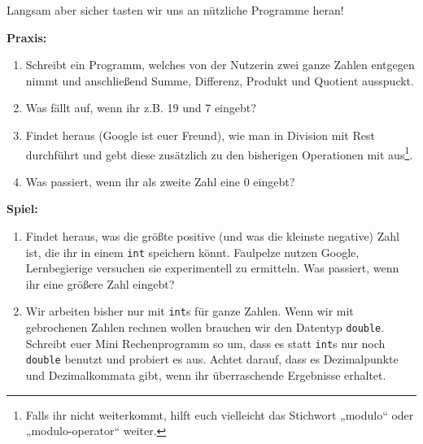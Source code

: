 
Langsam aber sicher tasten wir uns an nützliche Programme heran!

\textbf{Praxis:}
\begin{enumerate}[resume]
    \item Schreibt ein Programm, welches von der Nutzerin zwei ganze Zahlen
        entgegen nimmt und anschließend Summe, Differenz, Produkt und Quotient
        ausspuckt.
    \item Was fällt auf, wenn ihr z.B. 19 und 7 eingebt?
	\item Findet heraus (Google ist euer Freund), wie man in \Cpp Division mit
		Rest durchführt und gebt diese zusätzlich zu den bisherigen Operationen
		mit aus\footnote{Falls ihr nicht weiterkommt, hilft euch vielleicht das
		Stichwort „modulo“ oder „modulo-operator“ weiter.}.
    \item Was passiert, wenn ihr als zweite Zahl eine 0 eingebt?
\end{enumerate}

\textbf{Spiel:}
\begin{enumerate}
    \item Findet heraus, was die größte positive (und was die kleinste
        negative) Zahl ist, die ihr in einem \texttt{int} speichern könnt.
        Faulpelze nutzen Google, Lernbegierige versuchen sie experimentell zu
        ermitteln. Was passiert, wenn ihr eine größere Zahl eingebt?
    \item Wir arbeiten bisher nur mit \texttt{int}s für ganze Zahlen. Wenn wir
        mit gebrochenen Zahlen rechnen wollen brauchen wir den Datentyp
        \texttt{double}. Schreibt euer Mini Rechenprogramm so um, dass es statt
        \texttt{int}s nur noch \texttt{double} benutzt und probiert es aus.
        Achtet darauf, dass es Dezimalpunkte und Dezimalkommata gibt, wenn ihr
        überraschende Ergebnisse erhaltet.
\end{enumerate}
